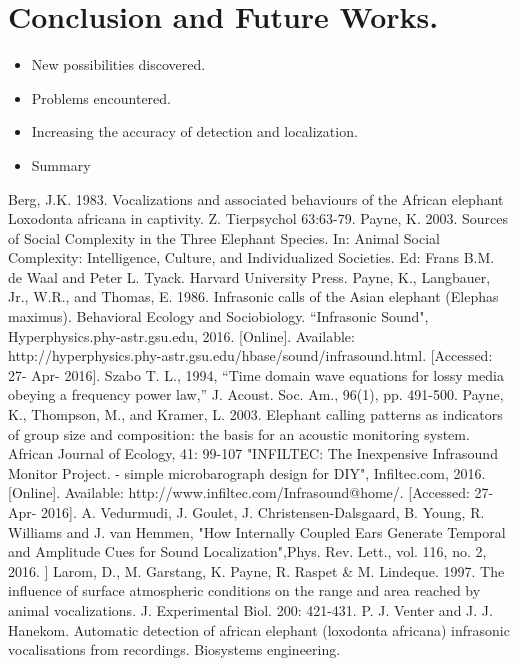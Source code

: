 \documentclass[12pt]{article}
\numberwithin{figure}{section}
\numberwithin{table}{section}
\begin{document}
\newpage
\section{Conclusion and Future Works.}
\begin{itemize}
  \item New possibilities discovered.
  \item Problems encountered.
  \item Increasing the accuracy of detection and localization.
  \item Summary
\end{itemize}

\newpage
\begin{thebibliography}{1}
 Berg, J.K. 1983. Vocalizations and associated behaviours of the African elephant Loxodonta africana in captivity. Z. Tierpsychol 63:63-79.
Payne, K. 2003. Sources of Social Complexity in the Three Elephant Species. In: Animal Social Complexity: Intelligence, Culture, and Individualized Societies. Ed: Frans B.M. de Waal and Peter L. Tyack. Harvard University Press.
 Payne, K., Langbauer, Jr., W.R., and Thomas, E. 1986. Infrasonic calls of the Asian elephant (Elephas maximus). Behavioral Ecology and Sociobiology.
 “Infrasonic Sound", Hyperphysics.phy-astr.gsu.edu, 2016. [Online]. Available: http://hyperphysics.phy-astr.gsu.edu/hbase/sound/infrasound.html. [Accessed: 27- Apr- 2016].
 Szabo T. L., 1994, “Time domain wave equations for lossy media obeying a frequency power law,” J. Acoust. Soc. Am., 96(1), pp. 491-500.
 Payne, K., Thompson, M., and Kramer, L. 2003. Elephant calling patterns as indicators of group size and composition: the basis for an acoustic monitoring system. African Journal of Ecology, 41: 99-107
 "INFILTEC: The Inexpensive Infrasound Monitor Project. - simple microbarograph design for DIY", Infiltec.com, 2016. [Online]. Available: http://www.infiltec.com/Infrasound@home/. [Accessed: 27- Apr- 2016].
 A. Vedurmudi, J. Goulet, J. Christensen-Dalsgaard, B. Young, R. Williams and J. van Hemmen, "How Internally Coupled Ears Generate Temporal and Amplitude Cues for Sound Localization",Phys. Rev. Lett., vol. 116, no. 2, 2016.
 ] Larom, D., M. Garstang, K. Payne, R. Raspet \& M. Lindeque. 1997. The influence of surface atmospheric conditions on the range and area reached by animal vocalizations. J. Experimental Biol. 200: 421-431.
 P. J. Venter and J. J. Hanekom. Automatic detection of african elephant (loxodonta africana) infrasonic vocalisations from recordings. Biosystems engineering.

\end{thebibliography}
\end{document}
